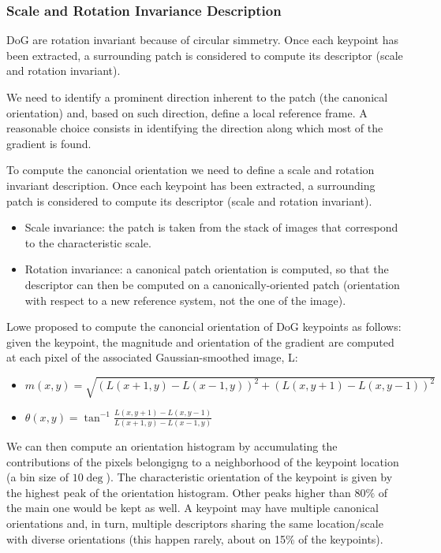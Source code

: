\documentclass{article}
\begin{document}
\subsubsection{Scale and Rotation Invariance Description}

DoG are rotation invariant because of circular simmetry.
Once each keypoint has been extracted, a surrounding patch is considered to compute its descriptor (scale and rotation invariant).

We need to identify a prominent direction inherent to the patch (the canonical orientation) and, based on such direction, define a local reference frame.
A reasonable choice consists in identifying the direction along which most of the gradient is found.

To compute the canoncial orientation we need to define a scale and rotation invariant description.
Once each keypoint has been extracted, a surrounding patch is considered to compute its descriptor (scale and rotation invariant).
\begin{itemize}
  \item Scale invariance: the patch is taken from the stack of images that correspond to the characteristic scale.
  \item Rotation invariance: a canonical patch orientation is computed, so that the descriptor can then be computed on a canonically-oriented patch (orientation with respect to a new reference system, not the one of the image).
\end{itemize}

Lowe proposed to compute the canoncial orientation of DoG keypoints as follows: given the keypoint, the magnitude and orientation of the gradient are computed at each pixel of the associated Gaussian-smoothed image, L:

\begin{itemize}
  \item $m(x,y) = \sqrt{(L(x+1,y)-L(x-1,y))^2 + (L(x,y+1) - L(x,y-1))^2}$
  \item $\theta(x,y) = \tan^{-1}\frac{L(x,y+1)-L(x,y-1)}{L(x+1,y)-L(x-1,y)}$
\end{itemize}

We can then compute an orientation histogram by accumulating the contributions of the pixels belongigng to a neighborhood of the keypoint location (a bin size of $10\deg$).
The characteristic orientation of the keypoint is given by the highest peak of the orientation histogram.
Other peaks higher than $80\%$ of the main one would be kept as well.
A keypoint may have multiple canonical orientations and, in turn, multiple descriptors sharing the same location/scale with diverse orientations (this happen rarely, about on 15\% of the keypoints).
\end{document}
